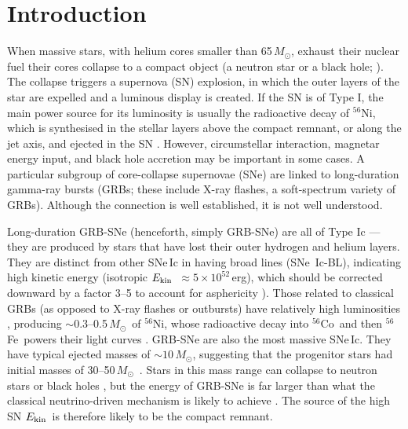 \documentclass[fleqn,usenatbib]{mnras}
\newcommand{\Msun}{$M_{\odot}$}
\newcommand{\Fefs}{$^{56}$Fe}
\newcommand{\Cofs}{$^{56}$Co}
\newcommand{\Nifs}{$^{56}$Ni}
\newcommand{\KE}{$E_{\rm kin}$}
\begin{document}


\section{Introduction}

When massive stars, with helium cores smaller than 65\,\Msun, exhaust their nuclear fuel their cores collapse to a 
compact object (a neutron star or a black hole; \citealt{Woosley17}). The collapse triggers a supernova (SN)
explosion, in which the outer layers of the star are expelled and a luminous
display is created. If the SN is of Type I, the main power source for its luminosity is usually the 
radioactive decay of \Nifs, which is synthesised in the stellar layers above the 
compact remnant, or along the jet axis, and ejected in the SN \citep{Barnes18}.
However, circumstellar interaction, magnetar \citep{Kasen10,Woosley10} energy input, and black hole accretion \citep{Woosley93,MacFadyen99,Dexter13} may be important in some cases.
A particular subgroup of core-collapse supernovae (SNe) are linked to long-duration gamma-ray 
bursts (GRBs; these include X-ray flashes, a soft-spectrum variety of GRBs).  
Although the connection is well established, it is not well understood. 

Long-duration GRB-SNe (henceforth, simply GRB-SNe) are all of Type Ic \citep{Filippenko97,Woosley06} --- they are produced by stars
that have lost their outer hydrogen and helium layers.   
They  are distinct from other
SNe\,Ic in having broad lines (SNe~Ic-BL), indicating high kinetic energy (isotropic \KE\ $\approx 5 \times 10^{52}$\,erg),
which should be corrected downward by a factor 3--5 to account for asphericity
\citep{Maeda02}).  Those related to classical GRBs (as opposed to X-ray flashes or outbursts)  have relatively high luminosities \citep{Mazzali14,Lyman16,Prentice16,Prentice19}, producing $\sim 0.3$--0.5\,\Msun\ of \Nifs, whose radioactive decay into \Cofs\ and then \Fefs\
powers their light curves \citep{Mazzali00,Drout11}. GRB-SNe are also the most massive
SNe\,Ic. They have typical ejected masses of $\sim 10$\,\Msun, suggesting that the
progenitor stars had initial masses of 30--50\,\Msun\
\citep{Iwamoto98,Deng05,Mazzali13}. Stars in this mass range can collapse to
neutron stars or black holes \citep{Ugliano12}, but the energy of GRB-SNe is far
larger than what the classical neutrino-driven mechanism is likely to achieve \citep{Janka12}. The
source of the high SN \KE\ is therefore likely to be the compact remnant. 
\end{document}
